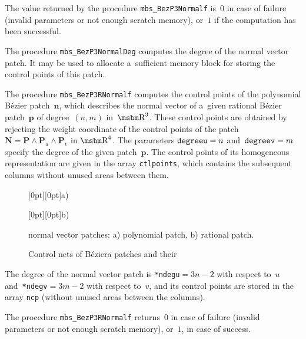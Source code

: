 \begin{sloppypar}
The value returned by the procedure \texttt{mbs\_BezP3Normalf} is~$0$
in case of failure (invalid parameters or not enough scratch memory),
or~$1$ if the computation has been successful.
\end{sloppypar}

\vspace{\smallskipamount}
The procedure \texttt{mbs\_BezP3NormalDeg} computes the degree of
the normal vector patch. It may be used to allocate a~sufficient memory
block for storing the control points of this patch.


\vspace{\bigskipamount}
The procedure \texttt{mbs\_BezP3RNormalf} computes the control points
of the polynomial B\'{e}zier patch~$\bm{n}$, which describes the normal
vector of a~given rational B\'{e}zier patch~$\bm{p}$ of degree~$(n,m)$
in~$\R^3$.
These control points are obtained by rejecting the weight coordinate
of the control points of the patch
$\bm{N}=\bm{P}\wedge\bm{P}_u\wedge\bm{P}_v$ in $\R^4$.
The parameters $\mathord{\mbox{\texttt{degreeu}}}=n$
and~$\mathord{\mbox{\texttt{degreev}}}=m$ specify the degree of the given
patch~$\bm{p}$. The control points of its homogeneous representation
are given in the array \texttt{ctlpoints}, which contains the subsequent
columns without unused areas between them.

\begin{figure}[ht]
  \centerline{\raisebox{90pt}[0pt][0pt]{a)}}
  \centerline{\raisebox{96pt}[0pt][0pt]{b)}}
  \caption{Control nets of B\'{e}ziera patches and their}
  \centerline{normal vector patches: a) polynomial patch, b) rational patch.}
\end{figure}
The degree of the normal vector patch is \texttt{*ndegu}$=3n-2$ with respect
to~$u$ and~\texttt{*ndegv}$=3m-2$ with respect to~$v$, and its control points
are stored in the array \texttt{ncp} (without unused areas between the columns).

The procedure \texttt{mbs\_BezP3RNormalf} returns~$0$ in case of failure
(invalid parameters or not enough scratch memory), or~$1$, in case of
success.

